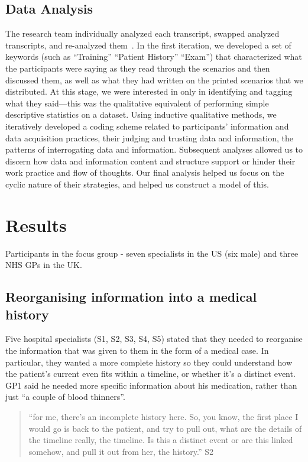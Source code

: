 \documentclass{sigchi}
\begin{document}
\subsection{Data Analysis}
The research team individually analyzed each transcript, swapped analyzed transcripts, and re-analyzed them~\cite{pope2000qualitative}.  In the first iteration, we developed a set of keywords (such as “Training” “Patient History” “Exam”) that characterized what the participants were saying as they read through the scenarios and then discussed them, as well as what they had written on the printed scenarios that we distributed. At this stage, we were interested in only in identifying and tagging what they said—this was the qualitative equivalent of performing simple descriptive statistics on a dataset.  Using inductive qualitative methods, \cite{corbin2014basics} we iteratively developed a coding scheme related to participants’ information and data acquisition practices, their judging and trusting data and information, the patterns of interrogating data and information. Subsequent analyses allowed us to discern how data and information content and structure support or hinder their work practice and flow of thoughts.  Our final analysis helped us focus on the cyclic nature of their strategies, and helped us construct a model of this.


\section{Results}

Participants in the focus group - seven specialists in the US (six male) and three NHS GPs in the UK.

    
    
\subsection{Reorganising information into a medical history}
Five hospital specialists (S1, S2, S3, S4, S5) stated that they needed to reorganise the information that was given to them in the form of a medical case. In particular, they wanted a more complete history so they could understand how the patient’s current even fits within a timeline, or whether it’s a distinct event. GP1 said he needed more specific information about his medication, rather than just ``a couple of blood thinners''.

\begin{quote}
    ``for me, there's an incomplete history here. So, you know, the first place I would go is back to the patient, and try to pull out, what are the details of the timeline really, the timeline. Is this a distinct event or are this linked somehow, and pull it out from her, the history.'' S2
\end{quote}
\end{document}

